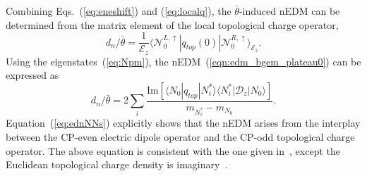 \documentclass[aps,prl,twocolumn,superscriptaddress,nofootinbib]{revtex4-2}
\newcommand{\mcD}{{\mathcal D}}
\newcommand{\mcE}{{\mathcal E}}
\newcommand{\lp}{\left}
\newcommand{\rp}{\right}
\newcommand{\la}{\langle}
\newcommand{\ra}{\rangle}
\begin{document}
Combining Eqs.~(\ref{eq:eneshift}) and (\ref{eq:localq}), the $\bar{\theta}$-induced nEDM can be determined from the matrix element of
the local topological charge operator,
\begin{equation}
\label{eqn:edm_bgem_plateau0}
d_n/\bar{\theta} = \frac{1}{\mcE_z} \la \mathcal{N}_0^{L,\uparrow} |q_{top}(0)| \mathcal{N}_0^{R,\uparrow}\ra_{\mcE_z}. 
\end{equation}
Using the eigenstates~(\ref{eq:Npm}), the nEDM~(\ref{eqn:edm_bgem_plateau0}) can be expressed as
\begin{equation}\label{eq:ednNNs}
d_n/\bar{\theta}
= 2\sum_i 
  \frac{ \mathrm{Im}\lp[\la N_0|q_{top}|N^*_i\ra \la N^*_i|\mcD_z |N_0\ra\rp]}
       { m_{N^*_i}-m_{N_0}}.
\end{equation}
Equation~(\ref{eq:ednNNs}) explicitly shows that
the nEDM arises from the interplay between the CP-even electric dipole operator and the CP-odd topological charge operator.
The above equation is consistent with the one given in~\cite{Baluni:1978rf,Baym:2016lyf}, 
except the Euclidean topological charge density is imaginary~\cite{Blum:2026hul}.
\end{document}
